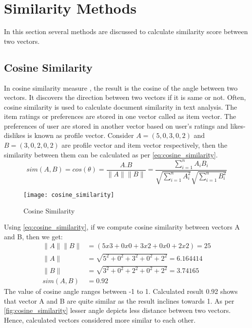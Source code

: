 
\section{Similarity Methods}
\label{similarity_methods}
In this section several methods are discussed to calculate similarity score between two vectors.
\\

\subsection{Cosine Similarity}
\label{cosine_similarity}
In cosine similarity measure \cite{19}, the result is the cosine of the angle between two vectors. It  discovers the direction between two vectors if it is same or not. Often, cosine similarity is used to calculate document similarity in text analysis. The item ratings or preferences are stored in one vector called as item vector. The preferences of user are stored in another vector based on user's ratings and likes-dislikes is known as profile vector. Consider $A = (5,0,3,0,2)$ and $B = (3,0,2,0,2)$ are profile vector and item vector respectively, then the similarity between them can be calculated as per \autoref{eq:cosine_similarity}.
\\

\begin{equation}
sim(A,B) = cos(\theta) = \frac {A.B}{\parallel A \parallel \parallel B \parallel} = \frac{\sum_{i=1}^{n} {A_{i} B_{i}}}{\sqrt{\sum_{i=1}^{n} {A_{i}^2}} \sqrt{\sum_{i=1}^{n} {B_{i}^2}}}
\label{eq:cosine_similarity}
\end{equation}

\begin{figure}[H]
	\centering
	\texttt{[image: cosine\_similarity]}
	\caption{Cosine Similarity}
	\label{fig:cosine_similarity}
\end{figure}

\noindent
Using \autoref{eq:cosine_similarity}, if we compute cosine similarity between vectors A and B, then we get:
\begin{align*}
\parallel A \parallel \parallel B \parallel &=(5 x 3 + 0 x 0 + 3 x 2 + 0 x 0 + 2 x 2  ) = 25 \\
\parallel A \parallel  &= \sqrt{5^2 + 0^2 + 3^2 + 0^2 + 2^2}  = 6.164414 \\	     
\parallel B \parallel  &= \sqrt{3^2 + 0^2 + 2^2 + 0^2 + 2^2}  = 3.74165\\	     
sim(A,B)  &=  0.92 
\end{align*}
\noindent The value of cosine angle ranges between -1 to 1. Calculated result 0.92 shows that vector A and B are quite similar as the result inclines towards 1. As per \autoref{fig:cosine_similarity} lesser angle depicts less distance between two vectors. Hence, calculated vectors considered more similar to each other.
\\
